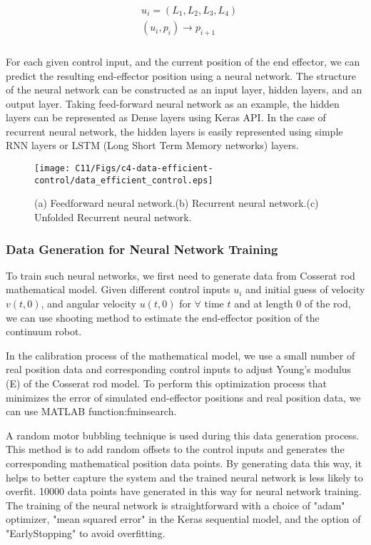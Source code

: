 \begin{align}
    \begin{split}
        &u_i=(L_1,L_2,L_3,L_4)\\
        &(u_i,p_i)\rightarrow p_{i+1}\\
    \end{split}
    \label{eq:X8}
\end{align}

For each given control input, and the current position of the end effector, we can predict the resulting end-effector position using a neural network. The structure of the neural network can be constructed as an input layer, hidden layers, and an output layer.  Taking feed-forward neural network as an example, the hidden layers can be represented as Dense layers using Keras API. In the case of recurrent neural network, the hidden layers is easily represented using simple RNN layers or LSTM (Long Short Term Memory networks) layers.  

\begin{figure*}[t!]
 \centering
 \texttt{[image: C11/Figs/c4-data-efficient-control/data\_efficient\_control.eps]} 
 \caption{(a) Feedforward neural network.(b) Recurrent neural network.(c) Unfolded Recurrent neural network.}
 \label{fig:X2}
\end{figure*}

\subsubsection{Data Generation for Neural Network Training}
\label{xin_neural_network_section}


To train such neural networks, we first need to generate data from Cosserat rod mathematical model. Given different control inputs $u_i$ and initial guess of velocity $v(t, 0)$, and angular velocity $u(t, 0)$ for $\forall$ time $t$ and at length 0 of the rod, we can use shooting method to estimate the end-effector position of the continuum robot. 

In the calibration process of the mathematical model, we use a small number of real position data and corresponding control inputs to adjust Young's modulus (E) of the Cosserat rod model. To perform this optimization process that minimizes the error of simulated end-effector positions and real position data, we can use MATLAB function:fminsearch. 

A random motor bubbling technique is used during this data generation process. This method is to add random offsets to the control inputs and generates the corresponding mathematical position data points. By generating data this way, it helps to better capture the system and the trained neural network is less likely to overfit. 10000 data points have generated in this way for neural network training. The training of the neural network is straightforward with a choice of "adam" optimizer, "mean squared error" in the Keras sequential model, and the option of "EarlyStopping" to avoid overfitting. 

